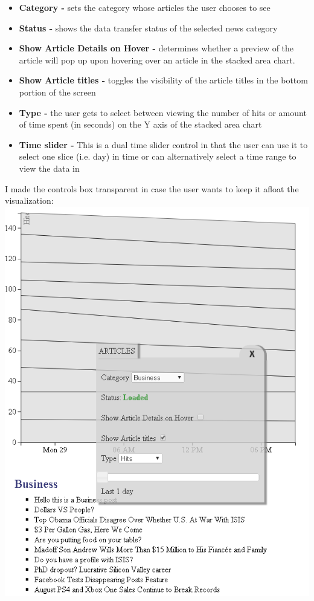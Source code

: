 \documentclass[12pt]{article}
\begin{document}
{\begin{itemize}
\item \textbf{Category - } sets the category whose articles the user chooses to see
\item \textbf{Status - } shows the data transfer status of the selected news category
\item \textbf{Show Article Details on Hover - } determines whether a preview of the article will pop up upon hovering over an article in the stacked area chart. 
\item \textbf{Show Article titles - } toggles the visibility of the article titles in the bottom portion of the screen
\item \textbf{Type - } the user gets to select between viewing the number of hits or amount of time spent (in seconds) on the Y axis of the stacked area chart
\item \textbf{Time slider - } This is a dual time slider control in that the user can use it to select one slice (i.e. day) in time or can alternatively select a time range to view the data in 
\end{itemize}

\newpage

\noindent I made the controls box transparent in case the user wants to keep it afloat the visualization: \\

\noindent\includegraphics[scale=0.8]{img/viz_6}



}
\end{document}
